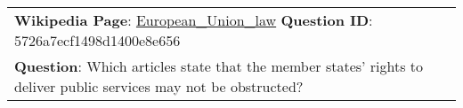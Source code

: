 \begin{figure*}[ht]
{\begin{tabular}{p{}}
            \textbf{Wikipedia Page}: \underline{European\_Union\_law} \textbf{Question ID}: 5726a7ecf1498d1400e8e656                                                                                                                                                                                                                                                                                                                                                                                                                                                                                                                                                                                                                                                                                                                                                                                                                                                                                                                                                                                                                                                                                                                                                                                                                                                                                                                                                         \\
            \textbf{Question}: Which articles state that the member states' rights to deliver public services may not be obstructed?                                                                                                                                                                                                                                                                                                                                                                                                                                                                                                                                                                                                                                                                                                                                                                                                                                                                                                                                                                                                                                                                                                                                                                                                                                                                                                                                         \\

\end{tabular}}
\end{figure*}
